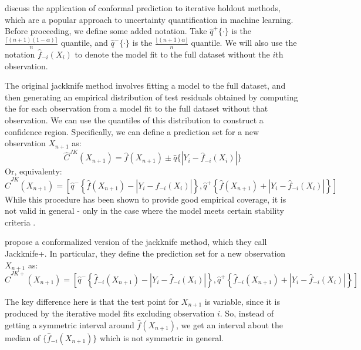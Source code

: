 \documentclass[a4paper, 12pt]{article}
\begin{document}
\textcite{barberPredictiveInferenceJackknife2020} discuss the application of conformal prediction to iterative holdout methods, which are a popular approach to uncertainty quantification in machine learning.\\

Before proceeding, we define some added notation. Take $\hat{q}^+\{\cdot \}$ is the $\frac{\lceil (n+1)(1-\alpha) \rceil }{n}$ quantile, and $\hat{q}^-\{\cdot \}$ is the $\frac{\lfloor (n+1)\alpha \rfloor }{n}$ quantile. We will also use the notation $\hat{f}_{-i}(X_i)$ to denote the model fit to the full dataset without the $i$th observation.

The original jackknife method involves fitting a model to the full dataset, and then generating an empirical distribution of test residuals obtained by computing the for each observation from a model fit to the full dataset without that observation. We can use the quantiles of this distribution to construct a confidence region. Specifically, we can define a prediction set for a new observation $X_{n+1}$ as:
\[ \hat{C}^{JK}(X_{n+1}) = \hat{f}(X_{n+1}) \pm \hat{q}\{ |Y_i - \hat{f}_{-i}(X_i)|\} \]
Or, equivalenty:
\[ \hat{C}^{JK}(X_{n+1}) = \left[ \hat{q}^{-}\left\{ \hat{f}(X_{n+1}) - |Y_i - \hat{f}_{-i}(X_i)|\right\}, \hat{q}^{+}\left\{ \hat{f}(X_{n+1}) + |Y_i - \hat{f}_{-i}(X_i)|\right\} \right] \]
While this procedure has been shown to provide good empirical coverage, it is not valid in general - only in the case where the model meets certain stability criteria \autocite{steinbergerConditionalPredictiveInference2022}.

\textcite{barberPredictiveInferenceJackknife2020} propose a conformalized version of the jackknife method, which they call Jackknife+. In particular, they define the prediction set for a new observation $X_{n+1}$ as:
\[ \hat{C}^{JK+}(X_{n+1}) = \left[ \hat{q}^{-}\left\{ \hat{f}_{-i}(X_{n+1}) - |Y_i - \hat{f}_{-i}(X_i)|\right\}, \hat{q}^{+}\left\{ \hat{f}_{-i}(X_{n+1}) + |Y_i - \hat{f}_{-i}(X_i)|\right\} \right] \]

The key difference here is that the test point for $X_{n+1}$ is variable, since it is produced by the iterative model fits excluding observation $i$. So, instead of getting a symmetric interval around $\hat{f}(X_{n+1})$, we get an interval about the median of $\{\hat{f}_{-i}(X_{n+1})\}$ which is not symmetric in general.
\end{document}
